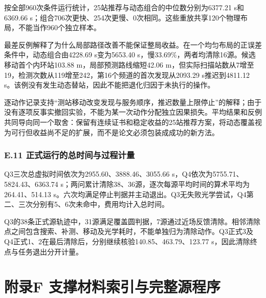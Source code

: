 \documentclass[UTF8,fontset=none,zihao=-4,a4paper]{ctexart}
\begin{document}
按全部960次条件运行统计，25站推荐与动态组合的中位数分别为6377.21 s和6369.66 s；组合706次更快、254次更慢、0次相同。这些重放共享120个物理布局，不能当作960个独立样本。

最差反例解释了为什么局部路径改善不能保证整局收益。在一个均匀布局的正误差条件中，动态组合由4228.69 s变为5653.40 s，慢33.69\%，两者均清除16源。候选移动首个内环站103.88 m，局部预测路线缩短42.06 m，但实际扫描站数从7增至19，检测次数从119增至242，第16个频道的首次发现从2093.29 s推迟到4811.12 s。该例没有发生动态替站，因此不能把退化归因于未执行的操作。

逐动作记录支持``测站移动改变发现与服务顺序，推迟数量上限停止''的解释；由于没有逐项反事实撤回实验，不能为某一次动作分配独立因果损失。平均结果和反例共同导向同一个取舍：保留有连续证书和稳定收益的25站推荐方案，将动态覆盖视为可行但收益尚不足的扩展，而不是论文必须包装成成功的新方法。

\subsubsection{E.11 正式运行的总时间与过程计量}\label{e.11-ux6b63ux5f0fux8fd0ux884cux7684ux603bux65f6ux95f4ux4e0eux8fc7ux7a0bux8ba1ux91cf}

Q3三次总虚拟时间依次为2955.60、3888.46、3055.66 s，Q4依次为5755.71、5824.43、6363.74 s；两问累计清除38、36源，逐次每源平均时间的算术平均为264.41、514.13 s。六次均满足停止判据并主动退出。Q3无失败光学尝试，Q4第二、三次分别有5、6次未命中，费用均计入总时间。

Q3的38条正式源轨迹中，31源满足覆盖圆判据，7源通过近场反馈清除。相邻清除点之间包含搜索、补测、移动及光学耗时，不能单独归为清除动作。Q3正式3及Q4正式1、2在最后清除后，分别继续核验140.85、463.79、123.77 s，因此清除终点与任务退出分开计量。
\endgroup
\clearpage
\section{附录F 支撑材料索引与完整源程序}


\end{document}
